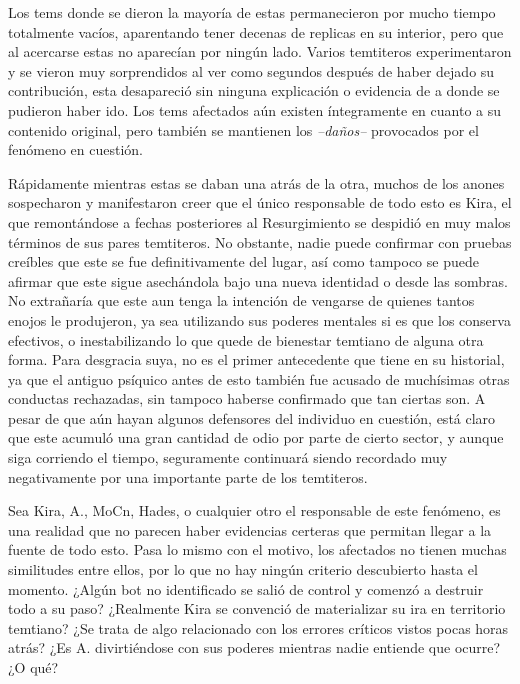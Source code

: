 \documentclass[
  spanish,
]{book}
\begin{document}
Los tems donde se dieron la mayoría de estas permanecieron por mucho tiempo totalmente vacíos, aparentando tener decenas de replicas en su interior, pero que al acercarse estas no aparecían por ningún lado. Varios temtiteros experimentaron y se vieron muy sorprendidos al ver como segundos después de haber dejado su contribución, esta desapareció sin ninguna explicación o evidencia de a donde se pudieron haber ido. Los tems afectados aún existen íntegramente en cuanto a su contenido original, pero también se mantienen los \emph{--daños--} provocados por el fenómeno en cuestión.

Rápidamente mientras estas se daban una atrás de la otra, muchos de los anones sospecharon y manifestaron creer que el único responsable de todo esto es Kira, el que remontándose a fechas posteriores al Resurgimiento se despidió en muy malos términos de sus pares temtiteros. No obstante, nadie puede confirmar con pruebas creíbles que este se fue definitivamente del lugar, así como tampoco se puede afirmar que este sigue asechándola bajo una nueva identidad o desde las sombras.
No extrañaría que este aun tenga la intención de vengarse de quienes tantos enojos le produjeron, ya sea utilizando sus poderes mentales si es que los conserva efectivos, o inestabilizando lo que quede de bienestar temtiano de alguna otra forma. Para desgracia suya, no es el primer antecedente que tiene en su historial, ya que el antiguo psíquico antes de esto también fue acusado de muchísimas otras conductas rechazadas, sin tampoco haberse confirmado que tan ciertas son.
A pesar de que aún hayan algunos defensores del individuo en cuestión, está claro que este acumuló una gran cantidad de odio por parte de cierto sector, y aunque siga corriendo el tiempo, seguramente continuará siendo recordado muy negativamente por una importante parte de los temtiteros.

Sea Kira, A., MoCn, Hades, o cualquier otro el responsable de este fenómeno, es una realidad que no parecen haber evidencias certeras que permitan llegar a la fuente de todo esto. Pasa lo mismo con el motivo, los afectados no tienen muchas similitudes entre ellos, por lo que no hay ningún criterio descubierto hasta el momento. ¿Algún bot no identificado se salió de control y comenzó a destruir todo a su paso? ¿Realmente Kira se convenció de materializar su ira en territorio temtiano? ¿Se trata de algo relacionado con los errores críticos vistos pocas horas atrás? ¿Es A. divirtiéndose con sus poderes mientras nadie entiende que ocurre? ¿O qué?
\end{document}
